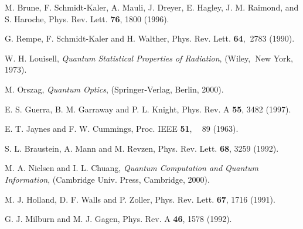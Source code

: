 \documentclass[12pt,thmsa]{article}
\begin{document}
\begin{thebibliography}{99}
 M. Brune, F. Schmidt-Kaler, A. Mauli, J. Dreyer, E.
Hagley, J. M. Raimond, and S. Haroche, Phys. Rev. Lett. \textbf{76}, 1800
(1996).

 G. Rempe, F. Schmidt-Kaler and H. Walther, Phys. Rev.
Lett. \textbf{64},\textbf{\ }2783 (1990).

 W. H. Louisell, \textit{Quantum Statistical Properties of
Radiation}, (Wiley,\textbf{\ }New York, 1973).

 M. Orszag, \textit{Quantum Optics}, (Springer-Verlag,
Berlin, 2000).

 E. S. Guerra, B. M. Garraway and P. L. Knight, Phys.
Rev. A \textbf{55}, 3482 (1997).

 E. T. Jaynes and F. W. Cummings, Proc. IEEE \textbf{51},%
\textbf{\ } 89 (1963).

 S. L. Braustein, A. Mann and M. Revzen, Phys. Rev. Lett. 
\textbf{68}, 3259 (1992).

 M. A. Nielsen and I. L. Chuang, \textit{Quantum
Computation and Quantum Information}, (Cambridge Univ. Press, Cambridge,
2000).

 M. J. Holland, D. F. Walls and P. Zoller, Phys. Rev. Lett. 
\textbf{67}, 1716 (1991).

 G. J. Milburn and M. J. Gagen, Phys. Rev. A \textbf{46},
1578 (1992).
\end{thebibliography}
\end{document}
